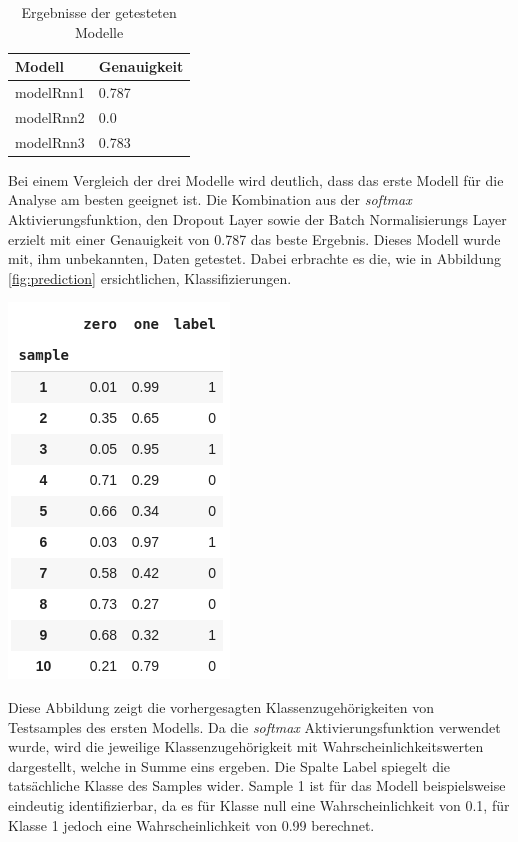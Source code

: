 \documentclass[
    12pt, %
    DIV10,
    ngerman, %
    a4paper, %
    oneside, %
    titlepage, %
    parskip=half, %
    headings=normal, %
    listof=totoc, %
    bibliography=totoc, %
    index=totoc, %
    captions=tableheading, %
    final %
]{scrreprt}
\begin{document}
\begin{table}[H]
\begin{center}
\begin{tabular}{ll}
\hline
\textbf{Modell}     & \textbf{Genauigkeit} \\ \hline
modelRnn1 & 0.787        \\ \hline
modelRnn2 & 0.0         \\ \hline
modelRnn3 & 0.783        \\ \hline
\end{tabular}
\caption{Ergebnisse der getesteten Modelle}\label{tab:models}
\label{tab:acc}
\end{center}
\end{table}
Bei einem Vergleich der drei Modelle wird deutlich, dass das erste Modell für die Analyse am besten geeignet ist. Die Kombination aus der \emph{softmax} Aktivierungsfunktion, den Dropout Layer sowie der Batch Normalisierungs Layer erzielt mit einer Genauigkeit von 0.787 das beste Ergebnis.
Dieses Modell wurde mit, ihm unbekannten, Daten getestet. Dabei erbrachte es die, wie in Abbildung \ref{fig:prediction} ersichtlichen, Klassifizierungen.
\begin{center}
\includegraphics[scale=0.7]{img/predictions.png}
\label{fig:prediction}
\end{center}
Diese Abbildung zeigt die vorhergesagten Klassenzugehörigkeiten von Testsamples des ersten Modells. Da die \emph{softmax}
Aktivierungsfunktion verwendet wurde, wird die jeweilige Klassenzugehörigkeit mit Wahrscheinlichkeitswerten dargestellt, welche in Summe eins ergeben. Die Spalte Label spiegelt die tatsächliche Klasse des Samples wider. Sample 1 ist für das Modell beispielsweise eindeutig identifizierbar, da es für Klasse null eine Wahrscheinlichkeit von 0.1, für Klasse 1 jedoch eine Wahrscheinlichkeit von 0.99 berechnet. 
\end{document}
